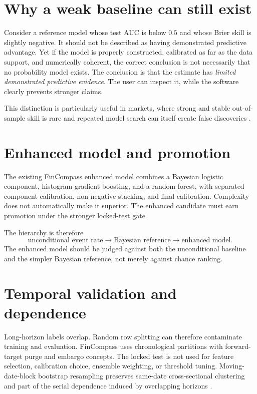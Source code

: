 \documentclass[11pt]{article}
\begin{document}
\section{Why a weak baseline can still exist}
Consider a reference model whose test AUC is below $0.5$ and whose Brier skill is slightly negative. It should not be described as having demonstrated predictive advantage. Yet if the model is properly constructed, calibrated as far as the data support, and numerically coherent, the correct conclusion is not necessarily that no probability model exists. The conclusion is that the estimate has \emph{limited demonstrated predictive evidence}. The user can inspect it, while the software clearly prevents stronger claims.

This distinction is particularly useful in markets, where strong and stable out-of-sample skill is rare and repeated model search can itself create false discoveries \citep{white2000reality,harvey2016crosssection,bailey2017pbo}.

\section{Enhanced model and promotion}
The existing FinCompass enhanced model combines a Bayesian logistic component, histogram gradient boosting, and a random forest, with separated component calibration, non-negative stacking, and final calibration. Complexity does not automatically make it superior. The enhanced candidate must earn promotion under the stronger locked-test gate.

The hierarchy is therefore
\begin{equation}
\text{unconditional event rate}\rightarrow\text{Bayesian reference}\rightarrow\text{enhanced model}.
\end{equation}
The enhanced model should be judged against both the unconditional baseline and the simpler Bayesian reference, not merely against chance ranking.

\section{Temporal validation and dependence}
Long-horizon labels overlap. Random row splitting can therefore contaminate training and evaluation. FinCompass uses chronological partitions with forward-target purge and embargo concepts. The locked test is not used for feature selection, calibration choice, ensemble weighting, or threshold tuning. Moving-date-block bootstrap resampling preserves same-date cross-sectional clustering and part of the serial dependence induced by overlapping horizons \citep{kunsch1989jackknife,politis1994stationary}.
\end{document}
